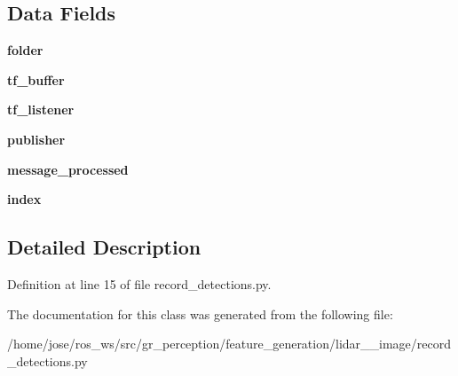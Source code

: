 \subsection*{Data Fields}
\begin{DoxyCompactItemize}
\item 
\mbox{\label{classrecord__detections_1_1DetectionRecorder_ac2a58e78d840a05f7143da3d3ee6d0d7}} 
{\bfseries folder}
\item 
\mbox{\label{classrecord__detections_1_1DetectionRecorder_a266b98d0749cfc4d3621249f123206fb}} 
{\bfseries tf\+\_\+buffer}
\item 
\mbox{\label{classrecord__detections_1_1DetectionRecorder_a2be3099938daca0074df386fba84d356}} 
{\bfseries tf\+\_\+listener}
\item 
\mbox{\label{classrecord__detections_1_1DetectionRecorder_a640072cf9781faa1ba599940b92e7806}} 
{\bfseries publisher}
\item 
\mbox{\label{classrecord__detections_1_1DetectionRecorder_aa4facfd54d7969d60eb2f6b92f537f50}} 
{\bfseries message\+\_\+processed}
\item 
\mbox{\label{classrecord__detections_1_1DetectionRecorder_aa04b1b0dc8ef7a297df73f36ac80d9db}} 
{\bfseries index}
\end{DoxyCompactItemize}


\subsection{Detailed Description}


Definition at line 15 of file record\+\_\+detections.\+py.



The documentation for this class was generated from the following file\+:\begin{DoxyCompactItemize}
\item 
/home/jose/ros\+\_\+ws/src/gr\+\_\+perception/feature\+\_\+generation/lidar\+\_\+\_\+image/record\+\_\+detections.\+py\end{DoxyCompactItemize}
